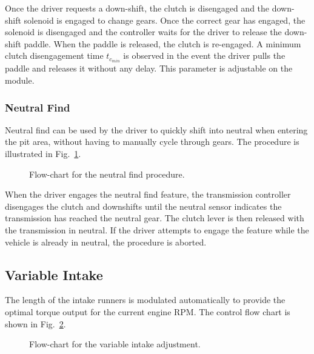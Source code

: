 Once the driver requests a down-shift, the clutch is disengaged and the down-shift solenoid is engaged to change gears. Once the correct gear has engaged, the solenoid is disengaged and the controller waits for the driver to release the down-shift paddle. When the paddle is released, the clutch is re-engaged. A minimum clutch disengagement time $t_{c_{min}}$ is observed in the event the driver pulls the paddle and releases it without any delay. This parameter is adjustable on the module.


\subsubsection{Neutral Find}

Neutral find can be used by the driver to quickly shift into neutral when entering the pit area, without having to manually cycle through gears. The procedure is illustrated in Fig.\ \ref{fig:transmission_neutralfind_flow}.

\begin{figure}[H]
	\centering
	
	\caption{Flow-chart for the neutral find procedure.}
	\label{fig:transmission_neutralfind_flow}
\end{figure}

When the driver engages the neutral find feature, the transmission controller disengages the clutch and downshifts until the neutral sensor indicates the transmission has reached the neutral gear. The clutch lever is then released with the transmission in neutral. If the driver attempts to engage the feature while the vehicle is already in neutral, the procedure is aborted.

\subsection{Variable Intake}

The length of the intake runners is modulated automatically to provide the optimal torque output for the current engine RPM. The control flow chart is shown in Fig.\ \ref{fig:engine_varintake_flow}. 

\begin{figure}[H]
	\centering
	
	\caption{Flow-chart for the variable intake adjustment.}
	\label{fig:engine_varintake_flow}
\end{figure}

